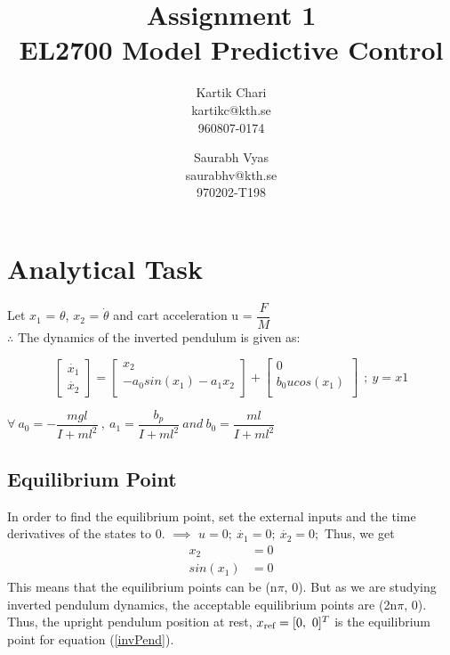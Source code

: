 \documentclass[a4paper,12pt]{article}
\title{
	Assignment 1\\
	EL2700 Model Predictive Control
}
\author{
	Kartik Chari\\
	kartikc@kth.se\\
	960807-0174
	\and
	Saurabh Vyas\\
	saurabhv@kth.se\\
	970202-T198
}
\begin{document}
\maketitle

\section{Analytical Task}
Let $x_1$ = $\theta$, $x_2$ = $\dot{\theta}$ and  cart acceleration u = $\dfrac{F}{M}$ \\
$\therefore$ The dynamics of the inverted pendulum is given as:

\begin{equation}
\begin{bmatrix}
  \dot{x_1} \\
 \dot{x_2}
\end{bmatrix}
=\begin{bmatrix}
 x_2\\
-a_0 sin(x_1) - a_1 x_2\\
\end{bmatrix}
+\begin{bmatrix}
0\\
b_0 u cos(x_1)\\
\end{bmatrix} \ \ ; \ y = x1
\label{invPend}
\end{equation}

$\forall \ a_0 = - \dfrac{mgl}{I + ml^{2}} \ , \ a_1 = \dfrac{b_p}{I + ml^{2}} \ and \ b_0 = \dfrac{ml}{I + ml^{2}}$
	\subsection{Equilibrium Point}
	In order to find the equilibrium point, set the external inputs and the time derivatives of the states to 0. $\implies$ $u = 0 ; \ \dot{x_1} = 0 ; \ \dot{x_2} = 0 ;$
	Thus, we get 
	\begin{align*}
	x_2 &= 0 \\
	sin(x_1) &= 0
	\end{align*}
This means that the equilibrium points can be (n$\pi$, 0). But as we are studying inverted pendulum dynamics, the acceptable equilibrium points are (2n$\pi$, 0). \\
Thus, the upright pendulum position at rest, $x\textsubscript{ref} = [0, \ 0]^{T}$ is the equilibrium point for equation (\ref{invPend}).
\end{document}
